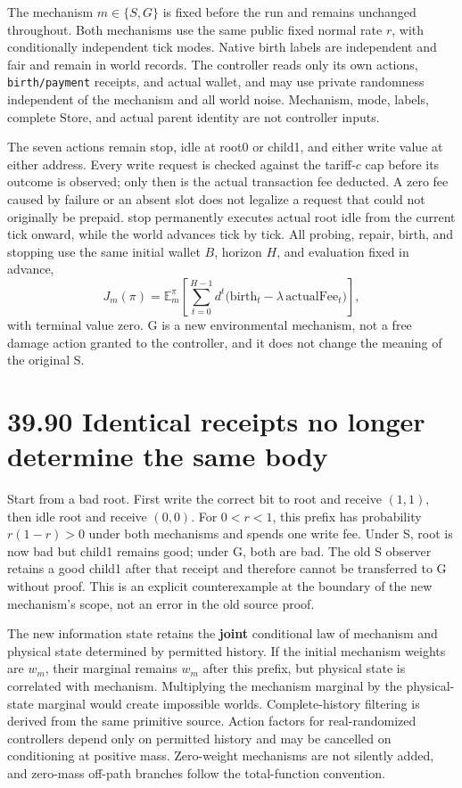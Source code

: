 \documentclass[
  english,
  11pt,
  oneside]{book}
\begin{document}
The mechanism \(m\in\{S,G\}\) is fixed before the run and remains unchanged throughout. Both mechanisms use the same public fixed normal rate \(r\), with conditionally independent tick modes. Native birth labels are independent and fair and remain in world records. The controller reads only its own actions, \nolinkurl{birth/payment} receipts, and actual wallet, and may use private randomness independent of the mechanism and all world noise. Mechanism, mode, labels, complete Store, and actual parent identity are not controller inputs.

The seven actions remain stop, idle at root0 or child1, and either write value at either address. Every write request is checked against the tariff-\(c\) cap before its outcome is observed; only then is the actual transaction fee deducted. A zero fee caused by failure or an absent slot does not legalize a request that could not originally be prepaid. stop permanently executes actual root idle from the current tick onward, while the world advances tick by tick. All probing, repair, birth, and stopping use the same initial wallet \(B\), horizon \(H\), and evaluation fixed in advance, \[J_m(\pi)=\mathbb E_m^\pi\!\left[\sum_{t=0}^{H-1}d^t\bigl(\mathrm{birth}_t-\lambda\,\mathrm{actualFee}_t\bigr)\right],\] with terminal value zero. G is a new environmental mechanism, not a free damage action granted to the controller, and it does not change the meaning of the original S.

\section{39.90 Identical receipts no longer determine the same body}\label{identical-receipts-no-longer-determine-the-same-body}

Start from a bad root. First write the correct bit to root and receive \((1,1)\), then idle root and receive \((0,0)\). For \(0<r<1\), this prefix has probability \(r(1-r)>0\) under both mechanisms and spends one write fee. Under S, root is now bad but child1 remains good; under G, both are bad. The old S observer retains a good child1 after that receipt and therefore cannot be transferred to G without proof. This is an explicit counterexample at the boundary of the new mechanism's scope, not an error in the old source proof.

The new information state retains the \textbf{joint} conditional law of mechanism and physical state determined by permitted history. If the initial mechanism weights are \(w_m\), their marginal remains \(w_m\) after this prefix, but physical state is correlated with mechanism. Multiplying the mechanism marginal by the physical-state marginal would create impossible worlds. Complete-history filtering is derived from the same primitive source. Action factors for real-randomized controllers depend only on permitted history and may be cancelled on conditioning at positive mass. Zero-weight mechanisms are not silently added, and zero-mass off-path branches follow the total-function convention.
\end{document}
